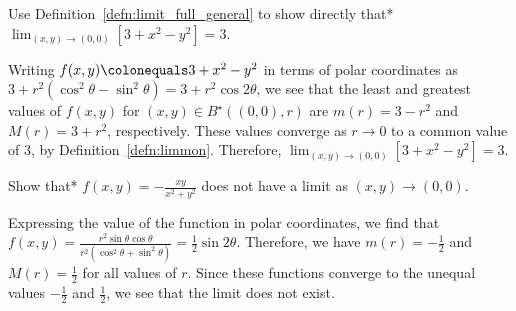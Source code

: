 \documentclass{watsonbook}
\begin{document}
\begin{example}{}{}
  Use Definition~\ref{defn:limit_full_general} to show directly that*
  $\displaystyle{\lim_{(x,y) \to (0,0)} \left[3 + x^2 - y^2\right] =
    3}$.
\end{example}

\begin{solution}
  Writing $f(x,y) \colonequals 3 + x^2 - y^2$ in terms of polar coordinates as
  $3 + r^2(\cos^2 \theta - \sin^2 \theta) = 3 +r^2 \cos2\theta$, we
  see that the least and greatest values of $f(x,y)$ for
  $(x,y) \in B^\star((0,0),r)$ are $m(r) = 3-r^2$ and
  $M(r) = 3 + r^2$, respectively. These values converge as $r\to 0$ to a common
  value of $3$, by Definition~\ref{defn:limmon}. Therefore,
  $\displaystyle{\lim_{(x,y) \to (0,0)} \left[3 + x^2 - y^2\right] =
    3}$. 
\end{solution}

\begin{example}{}{}
  Show that* $f(x,y) = -\frac{xy}{x^2 + y^2}$ does not have a limit as
  $(x,y) \to (0,0)$. 
\end{example}

\begin{solution}
  Expressing the value of the function in polar coordinates, we find
  that
  $f(x,y) =\frac{ r^2 \sin \theta \cos \theta}{r^2(\cos^2 \theta + \sin^2
  \theta)} = \tfrac{1}{2} \sin 2\theta$. Therefore, we have $m(r) =
-\tfrac{1}{2}$ and $M(r) = \tfrac{1}{2}$ for all values of $r$. Since
these functions converge to the unequal values $-\tfrac{1}{2}$ and
$\tfrac{1}{2}$, we see that the limit does not exist. 
\end{solution}
\end{document}
